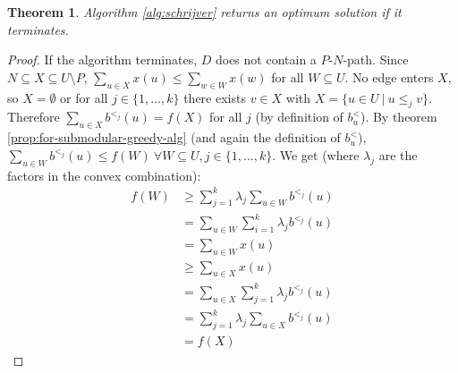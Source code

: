 \documentclass[11pt, a4paper]{article}
\newcommand{\set}[1]{\{#1\}}
\newtheorem{theorem}{Theorem}[section]
\theoremstyle{remark}
\theoremstyle{definition}
\begin{document}
\begin{theorem}
	Algorithm \ref{alg:schrijver} returns an optimum solution if it terminates.
\end{theorem}
\begin{proof}
	If the algorithm terminates, $D$ does not contain a $P$-$N$-path. Since
	$N\subseteq X\subseteq U\setminus P$, $\sum_{u\in X}x(u)\leq \sum_{w\in W}
		x(w)$ for all $W\subseteq U$.
	No edge enters $X$, so $X=\emptyset$ or for all $j\in\set{1,\ldots,k}$
	there exists $v\in X$ with $X=\set{u\in U\ |\ u\leq_j v}$. Therefore
	$\sum_{u\in X}b^{<_j}(u)=f(X)$ for all $j$ (by definition of $b^<_u$).
	By theorem \ref{prop:for-submodular-greedy-alg} (and again the
	definition of $b^<_u$), $\sum_{u\in W}b^{<_j}(u)\leq f(W)\ \forall
		W\subseteq U, j\in\set{1,\ldots,k}$.  We get (where $\lambda_j$
	are the factors in the convex combination):
	\begin{align*}
		f(W) & \geq \sum_{j=1}^k\lambda_j \sum_{u\in W}b^{<_j}(u) \\
		     & =\sum_{u\in W}\sum_{i=1}^k\lambda_j b^{<_j}(u)     \\
		     & =\sum_{u\in W}x(u)                                 \\
		     & \geq \sum_{u\in X}x(u)                             \\
		     & =\sum_{u\in X}\sum_{j=1}^k\lambda_jb^{<_j}(u)      \\
		     & =\sum_{j=1}^k\lambda_j\sum_{u\in X}b^{<_j}(u)      \\
		     & =f(X)
	\end{align*}
\end{proof}
\end{document}
